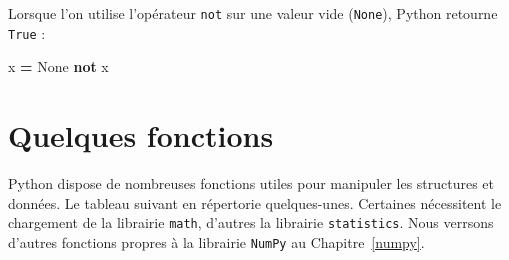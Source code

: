 \documentclass[12pt,]{book}
\newenvironment{Shaded}{\begin{snugshade}}{\end{snugshade}}
\newcommand{\KeywordTok}[1]{\textcolor[rgb]{0.13,0.29,0.53}{\textbf{#1}}}
\newcommand{\VariableTok}[1]{\textcolor[rgb]{0.00,0.00,0.00}{#1}}
\newcommand{\OperatorTok}[1]{\textcolor[rgb]{0.81,0.36,0.00}{\textbf{#1}}}
\newcommand{\NormalTok}[1]{#1}
\numberwithin{equation}{section}
\numberwithin{countremarque}{section}
\begin{document}
Lorsque l'on utilise l'opérateur \texttt{not} sur une valeur vide
(\texttt{None}), Python retourne \texttt{True} :

\begin{Shaded}
\begin{Highlighting}[]
\NormalTok{x }\OperatorTok{=} \VariableTok{None}
\KeywordTok{not}\NormalTok{ x}
\end{Highlighting}
\end{Shaded}

\section{Quelques fonctions}\label{quelques-fonctions}

Python dispose de nombreuses fonctions utiles pour manipuler les
structures et données. Le tableau suivant en répertorie quelques-unes.
Certaines nécessitent le chargement de la librairie \texttt{math},
d'autres la librairie \texttt{statistics}. Nous verrsons d'autres
fonctions propres à la librairie \texttt{NumPy} au Chapitre~\ref{numpy}.
\end{document}
